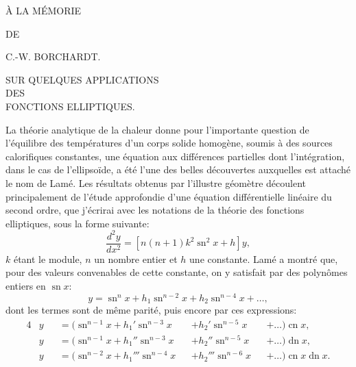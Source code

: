 \documentclass[11pt,leqno,oneside,letterpaper]{book}[2005/09/16]
\DeclareMathOperator{\sn}{sn}
\DeclareMathOperator{\cn}{cn}
\DeclareMathOperator{\dn}{dn}
\begin{document}
\newpage
\thispagestyle{empty}
\begin{center}
\vspace{3cm}
{\Large \`A LA M\'EMORIE} %

\bigskip\bigskip\bigskip\bigskip

DE

\bigskip\bigskip\bigskip\bigskip

{\Huge C.-W. BORCHARDT.}
\end{center}
\newpage
\mainmatter
\thispagestyle{empty}
\begin{center}
{\large SUR QUELQUES APPLICATIONS}\\[2ex]

{\small DES}\\[3ex]

{\LARGE FONCTIONS ELLIPTIQUES.}
\end{center}
\bigskip\bigskip\bigskip


La th\'eorie analytique de la chaleur donne pour l'importante question
de l'\'equilibre des temp\'eratures d'un corps solide homog\`ene, soumis \`a des
sources calorifiques constantes, une \'equation aux diff\'erences partielles
dont l'int\'egration, dans le cas de l'ellipso\"ide, a \'et\'e l'une des belles d\'ecouvertes
auxquelles est attach\'e le nom de Lam\'e. Les r\'esultats obtenus par
l'illustre g\'eom\`etre d\'ecoulent principalement de l'\'etude approfondie d'une
\'equation diff\'erentielle lin\'eaire du second ordre, que j'\'ecrirai avec les
notations de la th\'eorie des fonctions elliptiques, sous la forme suivante:
\[
\frac{d^2 y}{dx^2} = \left[ n(n+1) k^2 \sn^2 x + h \right] y,
\]
$k$ \'etant le module, $n$ un nombre entier et $h$ une constante. Lam\'e a montr\'e
que, pour des valeurs convenables de cette constante, on y satisfait par des
polyn\^omes entiers en $\sn x$:
\[
y = \sn^n x + h_1 \sn^{n-2} x + h_2 \sn^{n-4} x + \ldots,
\]
dont les termes sont de m\^eme parit\'e, puis encore par ces expressions:
\begin{alignat*}{4}
&y &&= (\sn^{n-1} x + h_1' \sn^{n-3} x &&+ h_2' \sn^{n-5} x &&+ \ldots) \cn x, \\
&y &&= (\sn^{n-1} x + h_1'' \sn^{n-3} x &&+ h_2'' \sn^{n-5} x &&+ \ldots) \dn x, \\
&y &&= (\sn^{n-2} x + h_1''' \sn^{n-4} x &&+ h_2''' \sn^{n-6} x &&+ \ldots) \cn x \dn x.
\end{alignat*}
\end{document}
